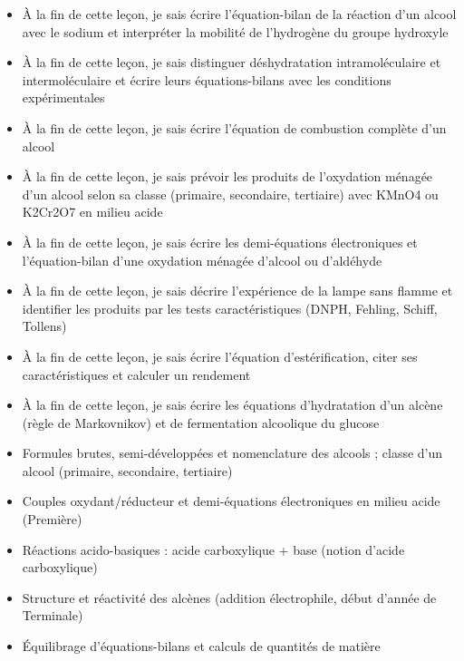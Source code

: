 \documentclass[11pt]{article}
\begin{document}
\begin{objectifs}
\begin{itemize}
\item À la fin de cette leçon, je sais écrire l'équation-bilan de la réaction d'un alcool avec le sodium et interpréter la mobilité de l'hydrogène du groupe hydroxyle
\item À la fin de cette leçon, je sais distinguer déshydratation intramoléculaire et intermoléculaire et écrire leurs équations-bilans avec les conditions expérimentales
\item À la fin de cette leçon, je sais écrire l'équation de combustion complète d'un alcool
\item À la fin de cette leçon, je sais prévoir les produits de l'oxydation ménagée d'un alcool selon sa classe (primaire, secondaire, tertiaire) avec KMnO4 ou K2Cr2O7 en milieu acide
\item À la fin de cette leçon, je sais écrire les demi-équations électroniques et l'équation-bilan d'une oxydation ménagée d'alcool ou d'aldéhyde
\item À la fin de cette leçon, je sais décrire l'expérience de la lampe sans flamme et identifier les produits par les tests caractéristiques (DNPH, Fehling, Schiff, Tollens)
\item À la fin de cette leçon, je sais écrire l'équation d'estérification, citer ses caractéristiques et calculer un rendement
\item À la fin de cette leçon, je sais écrire les équations d'hydratation d'un alcène (règle de Markovnikov) et de fermentation alcoolique du glucose
\end{itemize}
\end{objectifs}

\begin{prerequis}
\begin{itemize}
\item Formules brutes, semi-développées et nomenclature des alcools ; classe d'un alcool (primaire, secondaire, tertiaire)
\item Couples oxydant/réducteur et demi-équations électroniques en milieu acide (Première)
\item Réactions acido-basiques : acide carboxylique + base (notion d'acide carboxylique)
\item Structure et réactivité des alcènes (addition électrophile, début d'année de Terminale)
\item Équilibrage d'équations-bilans et calculs de quantités de matière
\end{itemize}
\end{prerequis}
\end{document}
